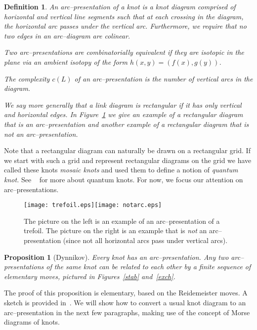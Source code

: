 \documentclass{amsart}
\newtheorem{definition}{Definition}
\newtheorem{proposition}[theorem]{Proposition}
\begin{document}
\begin{definition}
An \emph{arc--presentation} of a knot is a knot diagram comprised of horizontal and vertical line segments such that at each crossing in the diagram, the horizontal arc passes under the vertical arc. Furthermore, we require that no two edges in an arc--diagram are colinear.

Two arc--presentations are \emph{combinatorially equivalent} if they are isotopic in the plane via an ambient isotopy of the form $h(x,y)=(f(x),g(y))$.

The \emph{complexity} $c(L)$ of an arc--presentation is the number of vertical arcs in the diagram.

We say more generally that a link diagram is {\em rectangular} if it has only vertical and horizontal edges.
In Figure~\ref{arc} we give an example of a rectangular diagram that is an arc--presentation and another example of a rectangular diagram that is not an arc--presentation.  
\end{definition}

Note that a rectangular diagram can naturally be drawn on a rectangular grid. If we start with such a grid and represent rectangular diagrams on the grid we have called these knots {\em mosaic knots} and 
used them to define a notion of {\em quantum knot.}  See ~\cite{Mosaic} for more about quantum knots.
For now, we focus our attention on arc--presentations.

\begin{figure}[h]
\begin{center}
\texttt{[image: trefoil.eps]}\texttt{[image: notarc.eps]}
\end{center}
\vspace{-.3in}
\caption{ \small{The picture on the left is an example of an arc--presentation of a trefoil. The picture on the right is an example that is \emph{not} an arc--presentation (since not all horizontal arcs pass under vertical arcs).}}
\label{arc}
\end{figure}

\begin{proposition}[Dynnikov]
Every knot has an arc--presentation. Any two arc--presentations of the same knot can be related to each other by a finite sequence of \emph{elementary moves}, pictured in Figures~\ref{stab} and~\ref{exch}.
\end{proposition}

The proof of this proposition is elementary, based on the Reidemeister moves. A sketch is provided in~\cite{dynnikov}. We will show how to convert a usual knot diagram to an arc--presentation in the next few paragraphs, making use of the concept of Morse diagrams of knots.
\end{document}

